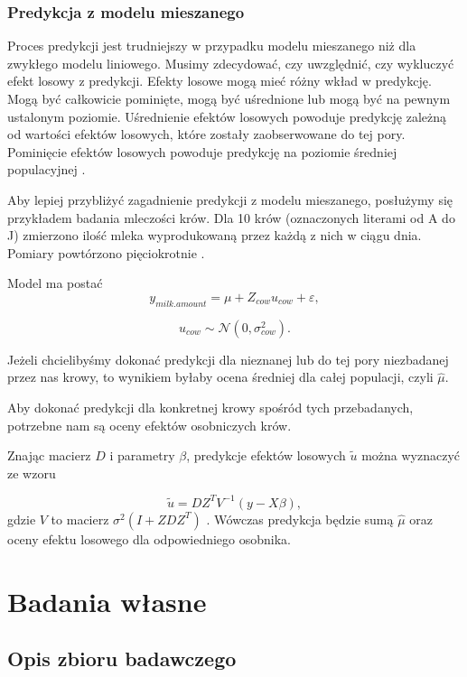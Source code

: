 \documentclass[12pt]{mwbk}
\theoremstyle{plain}
\theoremstyle{definition}
\theoremstyle{remark}
\begin{document}
\subsection{Predykcja z modelu mieszanego}
Proces predykcji jest trudniejszy w przypadku modelu mieszanego niż dla zwykłego modelu liniowego. Musimy zdecydować, czy uwzględnić, czy wykluczyć efekt losowy z predykcji. Efekty losowe mogą mieć różny wkład w predykcję. Mogą być całkowicie pominięte, mogą być uśrednione lub mogą być na pewnym ustalonym poziomie. Uśrednienie efektów losowych powoduje predykcję zależną od wartości efektów losowych, które zostały zaobserwowane do tej pory. Pominięcie efektów losowych powoduje predykcję na poziomie średniej populacyjnej
 \cite{prediction}.
 
 Aby lepiej przybliżyć zagadnienie predykcji z modelu mieszanego, posłużymy się przykładem badania mleczości krów. Dla 10 krów (oznaczonych literami od A do J) zmierzono ilość mleka wyprodukowaną przez każdą z nich w ciągu dnia. Pomiary powtórzono pięciokrotnie \cite{biecek}.
 
 Model ma postać 
 $$y_{milk.amount}=\mu+Z_{cow}u_{cow}+\varepsilon,$$

$$u_{cow} \sim \mathcal{N}(0, \sigma^2_{cow}).$$
 
 Jeżeli chcielibyśmy dokonać predykcji dla nieznanej lub do tej pory niezbadanej przez nas krowy, to wynikiem byłaby ocena średniej dla całej populacji, czyli $\hat{\mu}$.
 
 Aby dokonać predykcji dla konkretnej krowy spośród tych przebadanych, potrzebne nam są oceny efektów osobniczych krów.
 
 Znając macierz $D$ i parametry $\beta$, predykcje efektów losowych $\widetilde{u}$ można wyznaczyć ze wzoru
 
 $$\widetilde{u}=DZ^TV^{-1}(y-X\beta),$$
 gdzie $V$ to macierz $\sigma^2(I+ZDZ^T)$ \cite{biecek}. Wówczas predykcja będzie sumą $\hat{\mu}$ oraz oceny efektu losowego dla odpowiedniego osobnika.
 
 
\chapter{Badania własne}
\section{Opis zbioru badawczego}
\end{document}

